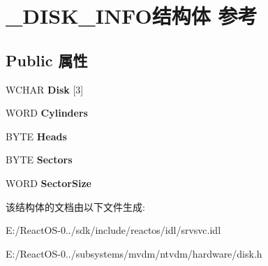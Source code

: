 \hypertarget{struct___d_i_s_k___i_n_f_o}{}\section{\+\_\+\+D\+I\+S\+K\+\_\+\+I\+N\+F\+O结构体 参考}
\label{struct___d_i_s_k___i_n_f_o}
\subsection*{Public 属性}
\begin{DoxyCompactItemize}
\item 
\mbox{\label{struct___d_i_s_k___i_n_f_o_a5e4a47f4b41bab50460a1d8c9834214b}} 
W\+C\+H\+AR {\bfseries Disk} \mbox{[}3\mbox{]}
\item 
\mbox{\label{struct___d_i_s_k___i_n_f_o_ab14e6795745db879b47a92f668b6f597}} 
W\+O\+RD {\bfseries Cylinders}
\item 
\mbox{\label{struct___d_i_s_k___i_n_f_o_aa5aadb007ba00e19464fc5ee62c7ce52}} 
B\+Y\+TE {\bfseries Heads}
\item 
\mbox{\label{struct___d_i_s_k___i_n_f_o_a32e3105d71d78fd945b470ddefa0bd36}} 
B\+Y\+TE {\bfseries Sectors}
\item 
\mbox{\label{struct___d_i_s_k___i_n_f_o_a4be8e07a51e4dbd757fe2b5375abc7cd}} 
W\+O\+RD {\bfseries Sector\+Size}
\end{DoxyCompactItemize}


该结构体的文档由以下文件生成\+:\begin{DoxyCompactItemize}
\item 
E\+:/\+React\+O\+S-\/0../sdk/include/reactos/idl/srvsvc.\+idl\item 
E\+:/\+React\+O\+S-\/0../subsystems/mvdm/ntvdm/hardware/disk.\+h\end{DoxyCompactItemize}
